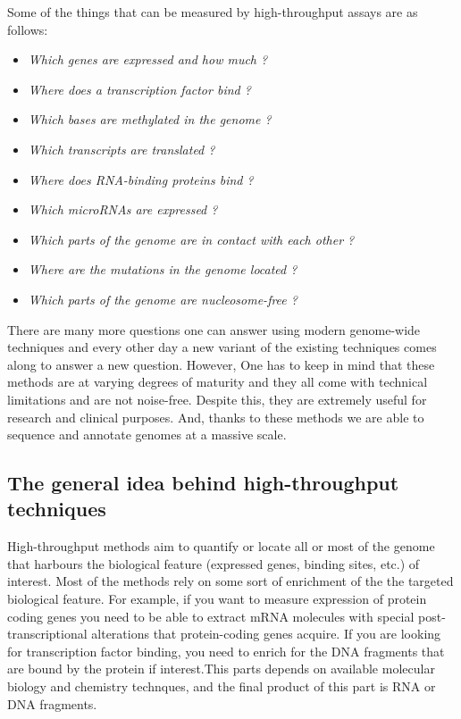 \documentclass[12pt,]{krantz}
\providecommand{\tightlist}{%
  \setlength{\itemsep}{0pt}\setlength{\parskip}{0pt}}
\begin{document}
Some of the things that can be measured by high-throughput assays are as follows:

\begin{itemize}
\tightlist
\item
  \emph{Which genes are expressed and how much ?}
\item
  \emph{Where does a transcription factor bind ?}
\item
  \emph{Which bases are methylated in the genome ?}
\item
  \emph{Which transcripts are translated ?}
\item
  \emph{Where does RNA-binding proteins bind ?}
\item
  \emph{Which microRNAs are expressed ?}
\item
  \emph{Which parts of the genome are in contact with each other ?}
\item
  \emph{Where are the mutations in the genome located ?}
\item
  \emph{Which parts of the genome are nucleosome-free ?}
\end{itemize}

There are many more questions one can answer using modern genome-wide techniques
and every other day a new variant of the existing techniques comes along
to answer a new question.
However, One has to keep in mind that these methods are at varying degrees
of maturity and they all come with technical limitations
and are not noise-free. Despite this, they are extremely useful for research and clinical
purposes. And, thanks to these methods we are able to sequence and annotate
genomes at a massive scale.

\hypertarget{the-general-idea-behind-high-throughput-techniques}{%
\subsection{The general idea behind high-throughput techniques}\label{the-general-idea-behind-high-throughput-techniques}}

High-throughput methods aim to quantify or locate all or most of the genome that harbours
the biological feature (expressed genes, binding sites, etc.) of interest.
Most of the methods rely on some sort of enrichment of the the targeted
biological feature. For example, if you want to measure expression of protein coding
genes you need to be able to extract mRNA molecules with special post-transcriptional
alterations that protein-coding genes acquire. If you are looking for transcription factor
binding, you need to enrich
for the DNA fragments that are bound by the protein if interest.This parts
depends on available molecular biology and chemistry technques, and the final
product of this part is RNA or DNA fragments.
\end{document}
